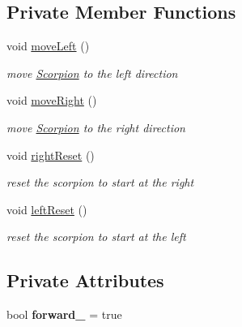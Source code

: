 \subsection*{Private Member Functions}
\begin{DoxyCompactItemize}
\item 
\mbox{\label{class_scorpion_ac455b0a8472ddfec0c8a3e2bef8e87a6}} 
void \mbox{\hyperlink{class_scorpion_ac455b0a8472ddfec0c8a3e2bef8e87a6}{move\+Left}} ()
\begin{DoxyCompactList}\small\item\em move \mbox{\hyperlink{class_scorpion}{Scorpion}} to the left direction \end{DoxyCompactList}\item 
\mbox{\label{class_scorpion_a6220ca4cfc5c17f4a96ab4e35b198bc7}} 
void \mbox{\hyperlink{class_scorpion_a6220ca4cfc5c17f4a96ab4e35b198bc7}{move\+Right}} ()
\begin{DoxyCompactList}\small\item\em move \mbox{\hyperlink{class_scorpion}{Scorpion}} to the right direction \end{DoxyCompactList}\item 
\mbox{\label{class_scorpion_a039d9e95b6e72d6d6767e3ffe0160aa6}} 
void \mbox{\hyperlink{class_scorpion_a039d9e95b6e72d6d6767e3ffe0160aa6}{right\+Reset}} ()
\begin{DoxyCompactList}\small\item\em reset the scorpion to start at the right \end{DoxyCompactList}\item 
\mbox{\label{class_scorpion_aaf8a8405cf42b12bfac85c25880e1447}} 
void \mbox{\hyperlink{class_scorpion_aaf8a8405cf42b12bfac85c25880e1447}{left\+Reset}} ()
\begin{DoxyCompactList}\small\item\em reset the scorpion to start at the left \end{DoxyCompactList}\end{DoxyCompactItemize}
\subsection*{Private Attributes}
\begin{DoxyCompactItemize}
\item 
\mbox{\label{class_scorpion_a9cb4ba3041279cfc5463f53544606e88}} 
bool {\bfseries forward\+\_\+} = true
\end{DoxyCompactItemize}


